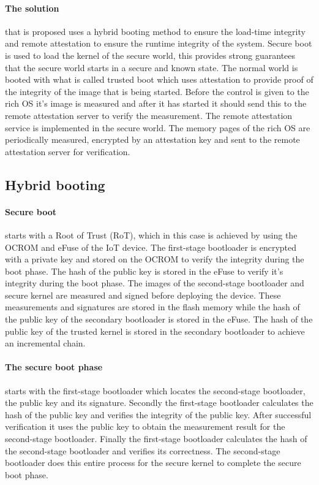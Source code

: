 \documentclass{report}
\begin{document}
\paragraph*{The solution}
that is proposed uses a hybrid booting method to ensure the load-time integrity and remote attestation to ensure the runtime integrity of the system. Secure boot is used to load the kernel of the secure world, this provides strong guarantees that the secure world starts in a secure and known state. The normal world is booted with what is called trusted boot which uses attestation to provide proof of the integrity of the image that is being started. Before the control is given to the rich OS it's image is measured and after it has started it should send this to the remote attestation server to verify the measurement. The remote attestation service is implemented in the secure world. The memory pages of the rich OS are periodically measured, encrypted by an attestation key and sent to the remote attestation server for verification.

\subsection*{Hybrid booting}

\paragraph*{Secure boot}
starts with a Root of Trust (RoT), which in this case is achieved by using the OCROM and eFuse of the IoT device. The first-stage bootloader is encrypted with a private key and stored on the OCROM to verify the integrity during the boot phase. The hash of the public key is stored in the eFuse to verify it's integrity during the boot phase. The images of the second-stage bootloader and secure kernel are measured and signed before deploying the device. These measurements and signatures are stored in the flash memory while the hash of the public key of the secondary bootloader is stored in the eFuse. The hash of the public key of the trusted kernel is stored in the secondary bootloader to achieve an incremental chain.

\paragraph*{The secure boot phase}
starts with the first-stage bootloader which locates the second-stage bootloader, the public key and its signature. Secondly the first-stage bootloader calculates the hash of the public key and verifies the integrity of the public key. After successful verification it uses the public key to obtain the measurement result for the second-stage bootloader. Finally the first-stage bootloader calculates the hash of the second-stage bootloader and verifies its correctness. The second-stage bootloader does this entire process for the secure kernel to complete the secure boot phase.
\end{document}
